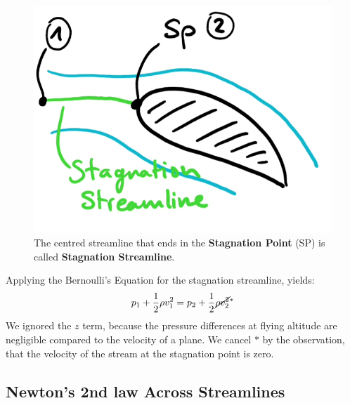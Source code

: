 \begin{figure}[H]
	\centering
	\includegraphics[width=0.3\linewidth]{Sketches/StagnationStreamline}
	\caption{The centred streamline that ends in the \textbf{Stagnation Point} (SP) is called \textbf{Stagnation Streamline}.}
	\label{fig:stagnationstreamline}
\end{figure}
Applying the Bernoulli's Equation for the stagnation streamline, yields:
\begin{equation*}
	p_1+\frac 12\rho v_1^2 = p_2 + \frac 12 \cancel{\rho v_2^2}^{\ast}
\end{equation*}
We ignored the $z$ term, because the pressure differences at flying altitude are negligible compared to the velocity of a plane. We cancel $\ast$ by the observation, that the velocity of the stream at the stagnation point is zero.

\subsection{Newton's 2nd law Across Streamlines}

